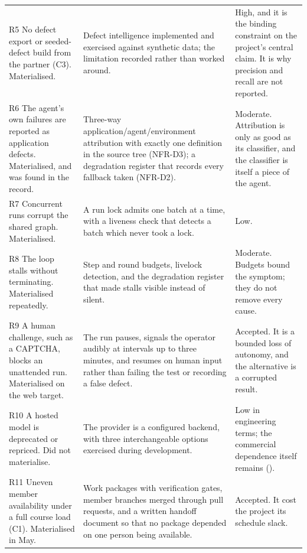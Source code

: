 \begin{xltabular}{\textwidth}{@{}>{\hsize}Y>{\hsize}Y>{\hsize}Y@{}}
  R5 No defect export or seeded-defect build from the partner (C3). Materialised. &
    Defect intelligence implemented and exercised against synthetic data; the limitation recorded rather than worked around. &
    High, and it is the binding constraint on the project's central claim. It is why precision and recall are not reported. \\
  \addlinespace
  R6 The agent's own failures are reported as application defects. Materialised, and was found in the record. &
    Three-way application/agent/environment attribution with exactly one definition in the source tree (NFR-D3); a degradation register that records every fallback taken (NFR-D2). &
    Moderate. Attribution is only as good as its classifier, and the classifier is itself a piece of the agent. \\
  \addlinespace
  R7 Concurrent runs corrupt the shared graph. Materialised. &
    A run lock admits one batch at a time, with a liveness check that detects a batch which never took a lock. &
    Low. \\
  \addlinespace
  R8 The loop stalls without terminating. Materialised repeatedly. &
    Step and round budgets, livelock detection, and the degradation register that made stalls visible instead of silent. &
    Moderate. Budgets bound the symptom; they do not remove every cause. \\
  \addlinespace
  R9 A human challenge, such as a CAPTCHA, blocks an unattended run. Materialised on the web target. &
    The run pauses, signals the operator audibly at intervals up to three minutes, and resumes on human input rather than failing the test or recording a false defect. &
    Accepted. It is a bounded loss of autonomy, and the alternative is a corrupted result. \\
  \addlinespace
  R10 A hosted model is deprecated or repriced. Did not materialise. &
    The provider is a configured backend, with three interchangeable options exercised during development. &
    Low in engineering terms; the commercial dependence itself remains (). \\
  \addlinespace
  R11 Uneven member availability under a full course load (C1). Materialised in May. &
    Work packages with verification gates, member branches merged through pull requests, and a written handoff document so that no package depended on one person being available. &
    Accepted. It cost the project its schedule slack. \\
\end{xltabular}
\endgroup

